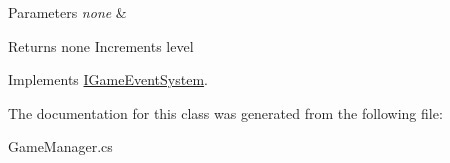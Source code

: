 \begin{DoxyParams}{Parameters}
{\em none} & \\
\hline
\end{DoxyParams}
\begin{DoxyReturn}{Returns}
none Increments level 
\end{DoxyReturn}


Implements \mbox{\hyperlink{interface_i_game_event_system_a1088da77edf39eb4cbfc32a5771f1092}{I\+Game\+Event\+System}}.



The documentation for this class was generated from the following file\+:\begin{DoxyCompactItemize}
\item 
Game\+Manager.\+cs\end{DoxyCompactItemize}
